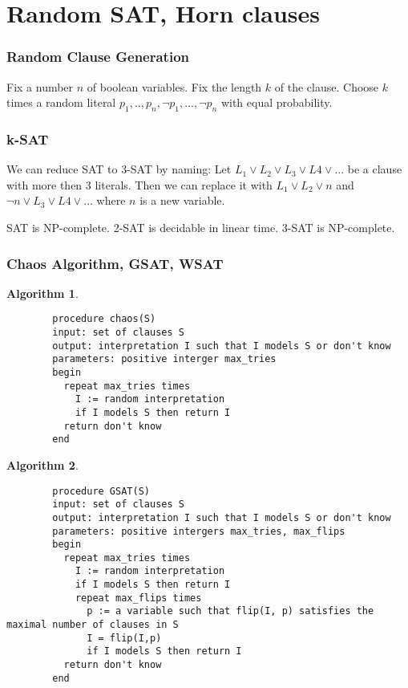 \documentclass[]{article}
\newtheorem{algorithm}{Algorithm}
\begin{document}
\section{Random SAT, Horn clauses}

\subsubsection{Random Clause Generation}

Fix a number $n$ of boolean variables. Fix the length $k$ of the clause. Choose $k$ times a random literal $p_1, .., p_n, \lnot p_1, ..., \lnot p_n$ with equal probability.

\subsubsection{k-SAT}

We can reduce SAT to 3-SAT by naming: Let $L_1 \lor L_2 \lor L_3 \lor L4 \lor ...$ be a clause with more then 3 literals. Then we can replace it with $L_1 \lor L_2 \lor n$ and $\lnot n \lor L_3 \lor L4 \lor ...$ where $n$ is a new variable.

SAT is NP-complete. 2-SAT is decidable in linear time. 3-SAT is NP-complete.

\subsubsection{Chaos Algorithm, GSAT, WSAT}

\begin{algorithm}
	\begin{verbatim}
		procedure chaos(S)
		input: set of clauses S
		output: interpretation I such that I models S or don't know
		parameters: positive interger max_tries
		begin
		  repeat max_tries times
		    I := random interpretation
		    if I models S then return I
		  return don't know
		end
	\end{verbatim}
\end{algorithm}

\begin{algorithm}
	\begin{verbatim}
		procedure GSAT(S)
		input: set of clauses S
		output: interpretation I such that I models S or don't know
		parameters: positive intergers max_tries, max_flips
		begin
		  repeat max_tries times
		    I := random interpretation
		    if I models S then return I
		    repeat max_flips times
		      p := a variable such that flip(I, p) satisfies the maximal number of clauses in S
		      I = flip(I,p)
		      if I models S then return I
		  return don't know
		end
	\end{verbatim}
\end{algorithm}
\end{document}
